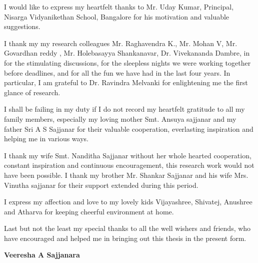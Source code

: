 I would like to express my heartfelt thanks to Mr. Uday Kumar, Principal, Nisarga Vidyanikethan School, Bangalore for his motivation and valuable suggestions.


I thank my my research colleagues Mr. Raghavendra K., Mr. Mohan V, Mr. Govardhan reddy , Mr. Holebasayya Shankanavar, Dr. Vivekananda Dambre, in for the stimulating discussions, for the sleepless nights we were working together before deadlines, and for all the fun we have had in the last four years. In particular, I am grateful to Dr. Ravindra Melvanki for enlightening me the first glance of research.

I shall be failing in my duty if I do not record my heartfelt gratitude to all my family members, especially my loving mother Smt. Ansuya sajjanar and my father Sri A S Sajjanar for their valuable cooperation, everlasting inspiration and helping me in various ways.

I thank my wife Smt. Nanditha Sajjanar without her whole hearted cooperation, constant inspiration and continuous encouragement, this research work would not have been possible. I thank my brother Mr. Shankar Sajjanar and his wife Mrs. Vinutha sajjanar for their support extended during this period.

I express my affection and love to my lovely kids Vijayashree, Shivatej, Anushree and Atharva for keeping cheerful environment at home.

Last but not the least my special thanks to all the well wishers and friends, who have encouraged and helped me in bringing out this thesis in the present form.

\vskip 1cm

\hfill {\bf Veeresha A Sajjanara}

